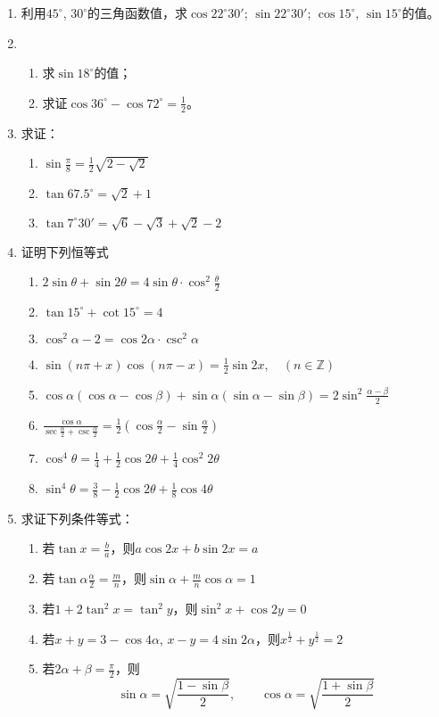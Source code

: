 \begin{enumerate}
\item 利用$45^{\circ}$, $30^{\circ}$的三角函数值，求$\cos22^{\circ}30'$; $\sin22^{\circ}30'$; $\cos15^{\circ}$, $\sin15^{\circ}$的值。
\item \begin{enumerate}
    \item 求$\sin18^{\circ}$的值；
    \item 求证$\cos36^{\circ}-\cos72^{\circ}=\frac{1}{2}$。
\end{enumerate}

\item 求证：
\begin{enumerate}
    \item $\sin\frac{\pi}{8}=\frac{1}{2}\sqrt{2-\sqrt{2}}$
    \item $\tan 67.5^{\circ}=\sqrt{2}+1$
    \item $\tan 7^{\circ}30'=\sqrt{6}-\sqrt{3}+\sqrt{2}-2$
\end{enumerate}
\item 证明下列恒等式
\begin{enumerate}
    \item $2\sin\theta+\sin2\theta=4\sin\theta\cdot \cos^2\frac{\theta}{2}$
    \item $\tan 15^{\circ}+\cot 15^{\circ}=4$
    \item $\cos^2\alpha-2=\cos2\alpha\cdot \csc^2\alpha$
    \item $\sin(n\pi+x)\cos(n\pi-x)=\frac{1}{2}\sin 2x,\quad (n\in \mathbb{Z})$
    \item $\cos\alpha(\cos\alpha-\cos\beta)+\sin\alpha(\sin\alpha-\sin\beta)=2\sin^2\frac{\alpha-\beta}{2}$
    \item $\frac{\cos\alpha}{\sec\frac{\alpha}{2}+\csc\frac{\alpha}{2}}=\frac{1}{2}\left(\cos\frac{\alpha}{2}-\sin\frac{\alpha}{2}\right)$
    \item $\cos^4\theta=\frac{1}{4}+\frac{1}{2}\cos2\theta+\frac{1}{4}\cos^2 2\theta$
    \item $\sin^4\theta=\frac{3}{8}-\frac{1}{2}\cos2\theta+\frac{1}{8}\cos4\theta$
\end{enumerate}

\item 求证下列条件等式：
\begin{enumerate}
    \item 若$\tan x=\frac{b}{a}$，则$a\cos 2x+b\sin 2x=a$
    \item 若$\tan\alpha\frac{\alpha}{2}=\frac{m}{n}$，则$\sin\alpha+\frac{m}{n}\cos\alpha=1$
    \item 若$1+2\tan^2 x=\tan^2 y$，则$\sin^2x+\cos 2y=0$
    \item 若$x+y=3-\cos4\alpha$, $x-y=4\sin2\alpha$，则$x^{\tfrac{1}{2}}+y^{\tfrac{1}{2}}=2$
    \item 若$2\alpha+\beta=\frac{\pi}{2}$，则
    \[\sin\alpha=\sqrt{\frac{1-\sin\beta}{2}},\qquad \cos\alpha=\sqrt{\frac{1+\sin\beta}{2}}\]
\end{enumerate}
\end{enumerate}

